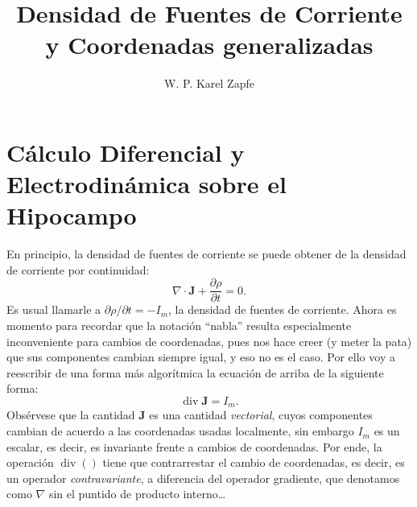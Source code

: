 \documentclass{article}
\title{Densidad de Fuentes de Corriente y Coordenadas generalizadas}
\author{W. P. Karel Zapfe}
\newcommand{\Jd}{\mathbf{J}}
\DeclareMathOperator{\diver}{div}
\begin{document}
\maketitle

\section{Cálculo Diferencial y Electrodinámica sobre el Hipocampo}

En principio, la densidad de fuentes de corriente se puede obtener
de la densidad de corriente por continuidad:
\begin{equation}
\nabla \cdot \Jd +\frac{\partial \rho}{\partial t}=0.
\end{equation}
Es usual llamarle a $\partial \rho /\partial t =-I_m$, la densidad de 
fuentes de corriente.
Ahora es momento para recordar que la notación ``nabla'' resulta especialmente
inconveniente para cambios de coordenadas, pues nos hace creer (y meter la pata)
que sus componentes cambian siempre igual, y eso no es el caso. Por
ello voy a reescribir de una forma más algorítmica la ecuación de arriba
de la siguiente forma:
\begin{equation}
\diver \Jd =I_m.
\end{equation}
Obsérvese que la cantidad $\Jd$ es una cantidad \emph{vectorial}, cuyos componentes
cambian de acuerdo a las coordenadas usadas localmente, sin embargo $I_m$ es un
escalar, es decir, es invariante frente a cambios de coordenadas. Por
ende, la operación $\diver ()$ tiene que contrarrestar el cambio de coordenadas,
es decir, es un operador \emph{contravariante}, a diferencia del operador
gradiente, que denotamos como $\nabla$ sin el puntido de producto interno\ldots
\end{document}
